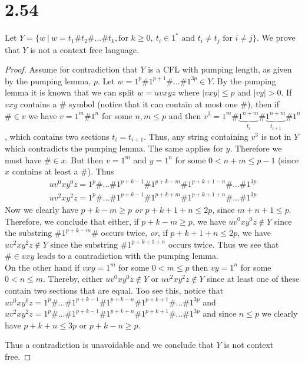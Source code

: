 \documentclass[a4paper,11pt]{article}
\newcommand{\abs}[1]{\left\lvert #1 \right\rvert}
\numberwithin{equation}{section}
\begin{document}
	\section*{2.54}
	Let $ Y=\{w\ \vert\ w=t_1\#t_2\#...\#t_k, \text{for }k\geq0,\ t_i\in 1^\ast\text{ and } t_i\neq t_j\text{ for }i\neq j \} $. We prove that $ Y $ is not a context free language. \begin{proof}
		Assume for contradiction that $ Y $ is a CFL with pumping length, as given by the pumping lemma, $ p $. Let $ w=1^p\#1^{p+1}\#...\#1^{3p} \in Y$. By the pumping lemma it is known that we can split $ w=uvxyz $ where $ \abs{vxy}\leq p $ and $ \abs{vy}>0 $. If $ vxy $ contains a $ \# $ symbol (notice that it can contain at most one $ \# $), then if $ \#\in v $ we have $ v=1^m\#1^n $ for some $ n,m\leq p $ and then $ v^3=1^m\#\underbrace{1^{n+m}}_{t_i}\#\underbrace{1^{n+m}}_{t_{i+1}}\#1^n $, which contains two sections $ t_i=t_{i+1} $. Thus, any string containing $ v^3 $ is not in $ Y $ which contradicts the pumping lemma. The same applies for $ y $. Therefore we must have $ \#\in x $. But then $ v=1^m $ and $ y=1^n $ for some $ 0<n+m\leq p-1 $ (since $ x $ contains at least a $ \# $). Thus \begin{equation*}
		\begin{aligned}
		uv^0xy^0z=1^p\#...\#1^{p+k-1}\#1^{p+k-m}\#1^{p+k+1-n}\#...\#1^{3p}\\
		uv^2xy^2z=1^p\#...\#1^{p+k-1}\#1^{p+k+m}\#1^{p+k+1+n}\#...\#1^{3p}
		\end{aligned}
		\end{equation*}
		Now we clearly have $ p+k-m\geq p $ \emph{or} $ p+k+1+n\leq2p $, since $ m+n+1\leq p $. Therefore, we conclude that either, if $ p+k-m\geq p $, we have $  uv^0xy^0z\notin Y $ since the substring $ \#1^{p+k-m}\# $ occurs twice, \emph{or}, if $ p+k+1+n\leq2p $, we have $ uv^2xy^2z\notin Y $ since the substring $ \#1^{p+k+1+n} $ occurs twice. Thus we see that $ \#\in vxy $ leads to a contradiction with the pumping lemma.\\
		On the other hand if $ vxy=1^m $ for some $ 0<m\leq p $ then $ vy=1^n $ for some $ 0<n\leq m $. Thereby, either $ uv^0xy^0z\notin Y $ or $ uv^2xy^2z\notin Y $ since at least one of these contain two sections that are equal. Too see this, notice that $ uv^0xy^0z=1^p\#...\#1^{p+k-1}\#1^{p+k-n}\#1^{p+k+1}\#...\#1^{3p} $ and $ uv^2xy^2z=1^p\#...\#1^{p+k-1}\#1^{p+k+n}\#1^{p+k+1}\#...\#1^{3p}  $ and since $ n\leq p $ we clearly have $ p+k+n\leq3p $ or $ p+k-n\geq p $.
		
		Thus a contradiction is unavoidable and we conclude that $ Y $ is not context free.
	\end{proof}
	
\end{document}
